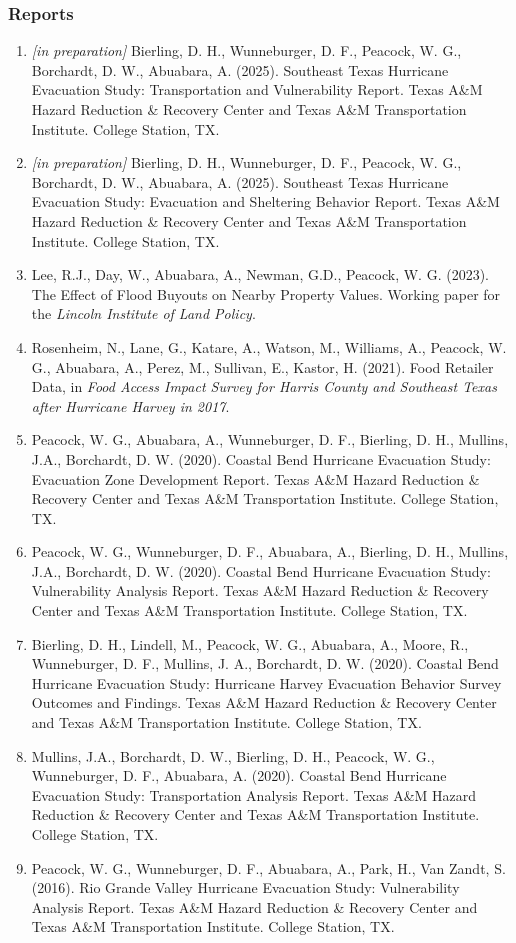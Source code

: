 \documentclass[11pt,oneside]{article}
\begin{document}
\subsubsection{Reports}
\begin{enumerate}[leftmargin=40pt]
\item \emph{[in preparation]} Bierling, D. H., Wunneburger, D. F., Peacock, W. G., Borchardt, D. W., Abuabara, A. (2025). {Southeast Texas Hurricane Evacuation Study: Transportation and Vulnerability Report}. Texas A\&M Hazard Reduction \& Recovery Center and Texas A\&M Transportation Institute. College Station, TX.
\item \emph{[in preparation]} Bierling, D. H., Wunneburger, D. F., Peacock, W. G., Borchardt, D. W., Abuabara, A. (2025). {Southeast Texas Hurricane Evacuation Study: Evacuation and Sheltering Behavior Report}. Texas A\&M Hazard Reduction \& Recovery Center and Texas A\&M Transportation Institute. College Station, TX.
\item Lee, R.J., Day, W., Abuabara, A., Newman, G.D., Peacock, W. G. (2023). The Effect of Flood Buyouts on Nearby Property Values. Working paper for the \emph{Lincoln Institute of Land Policy}.
\item Rosenheim, N., Lane, G., Katare, A., Watson, M., Williams, A., Peacock, W. G., Abuabara, A., Perez, M., Sullivan, E., Kastor, H. (2021). Food Retailer Data, in \emph{Food Access Impact Survey for Harris County and Southeast Texas after Hurricane Harvey in 2017}.
\item Peacock, W. G., Abuabara, A., Wunneburger, D. F., Bierling, D. H., Mullins, J.A., Borchardt, D. W. (2020). Coastal Bend Hurricane Evacuation Study: Evacuation Zone Development Report. Texas A\&M Hazard Reduction \& Recovery Center and Texas A\&M Transportation Institute. College Station, TX.
\item Peacock, W. G., Wunneburger, D. F., Abuabara, A., Bierling, D. H., Mullins, J.A., Borchardt, D. W. (2020). Coastal Bend Hurricane Evacuation Study: Vulnerability Analysis Report. Texas A\&M Hazard Reduction \& Recovery Center and Texas A\&M Transportation Institute. College Station, TX.
\item Bierling, D. H., Lindell, M., Peacock, W. G., Abuabara, A., Moore, R., Wunneburger, D. F., Mullins, J. A., Borchardt, D. W. (2020). Coastal Bend Hurricane Evacuation Study: Hurricane Harvey Evacuation Behavior Survey Outcomes and Findings. Texas A\&M Hazard Reduction \& Recovery Center and Texas A\&M Transportation Institute. College Station, TX.
\item Mullins, J.A., Borchardt, D. W., Bierling, D. H., Peacock, W. G., Wunneburger, D. F., Abuabara, A. (2020). Coastal Bend Hurricane Evacuation Study: Transportation Analysis Report. Texas A\&M Hazard Reduction \& Recovery Center and Texas A\&M Transportation Institute. College Station, TX.
\item Peacock, W. G., Wunneburger, D. F., Abuabara, A., Park, H., Van Zandt, S. (2016). Rio Grande Valley Hurricane Evacuation Study: Vulnerability Analysis Report. Texas A\&M Hazard Reduction \& Recovery Center and Texas A\&M Transportation Institute. College Station, TX.
\end{enumerate}
\end{document}
